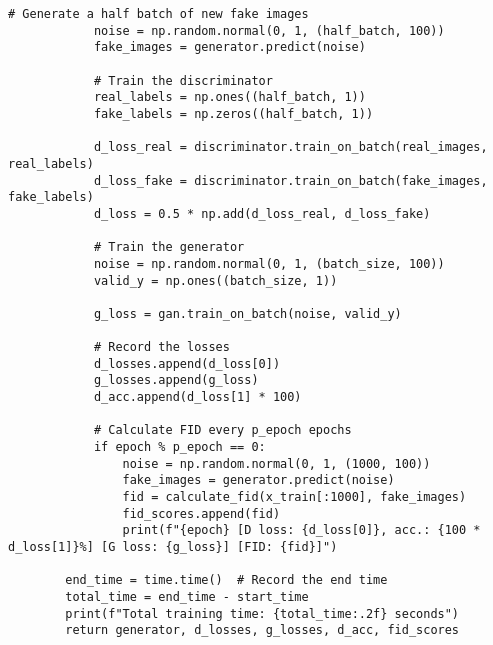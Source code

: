 \begin{lstlisting}[style=mypython, caption= {Explore GAN with 5 Convolutional Layers in Generator \\ and 3 Convolutional Layers in Discriminator}]
            # Generate a half batch of new fake images
            noise = np.random.normal(0, 1, (half_batch, 100))
            fake_images = generator.predict(noise)
    
            # Train the discriminator
            real_labels = np.ones((half_batch, 1))
            fake_labels = np.zeros((half_batch, 1))
    
            d_loss_real = discriminator.train_on_batch(real_images, real_labels)
            d_loss_fake = discriminator.train_on_batch(fake_images, fake_labels)
            d_loss = 0.5 * np.add(d_loss_real, d_loss_fake)
    
            # Train the generator
            noise = np.random.normal(0, 1, (batch_size, 100))
            valid_y = np.ones((batch_size, 1))
    
            g_loss = gan.train_on_batch(noise, valid_y)
    
            # Record the losses
            d_losses.append(d_loss[0])
            g_losses.append(g_loss)
            d_acc.append(d_loss[1] * 100)
            
            # Calculate FID every p_epoch epochs
            if epoch % p_epoch == 0:
                noise = np.random.normal(0, 1, (1000, 100))
                fake_images = generator.predict(noise)
                fid = calculate_fid(x_train[:1000], fake_images)
                fid_scores.append(fid)
                print(f"{epoch} [D loss: {d_loss[0]}, acc.: {100 * d_loss[1]}%] [G loss: {g_loss}] [FID: {fid}]")
    
        end_time = time.time()  # Record the end time
        total_time = end_time - start_time
        print(f"Total training time: {total_time:.2f} seconds")
        return generator, d_losses, g_losses, d_acc, fid_scores
    
\end{lstlisting}

